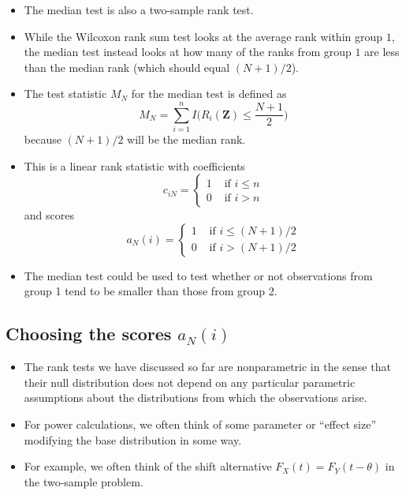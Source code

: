 \documentclass[]{book}
\begin{document}
\begin{itemize}
\item
  The median test is also a two-sample rank test.
\item
  While the Wilcoxon rank sum test looks at the average rank within group \(1\),
  the median test instead looks at how many of the ranks from group \(1\)
  are less than the median rank (which should equal \((N+1)/2\)).
\item
  The test statistic \(M_{N}\) for the median test is defined as
  \begin{equation}
  M_{N} = \sum_{i=1}^{n} I\Big( R_{i}(\mathbf{Z}) \leq \frac{N+1}{2} \Big)
  \end{equation}
  because \((N+1)/2\) will be the median rank.
\item
  This is a linear rank statistic with coefficients
  \begin{equation}
  c_{iN} = \begin{cases}
   1 & \textrm{ if } i \leq n \\
   0 & \textrm{ if } i > n 
   \end{cases}
  \end{equation}
  and scores
  \begin{equation}
  a_{N}(i) = 
  \begin{cases}
   1 & \textrm{ if } i \leq (N+1)/2 \\
   0 & \textrm{ if } i > (N+1)/2 
   \end{cases}
  \end{equation}
\item
  The median test could be used to test whether or not observations
  from group 1 tend to be smaller than those from group 2.
\end{itemize}

\hypertarget{choosing-the-scores-a_ni}{%
\subsection{\texorpdfstring{Choosing the scores \(a_{N}(i)\)}{Choosing the scores a\_\{N\}(i)}}\label{choosing-the-scores-a_ni}}

\begin{itemize}
\item
  The rank tests we have discussed so far are nonparametric in the sense
  that their null distribution does not depend on any particular parametric
  assumptions about the distributions from which the observations arise.
\item
  For power calculations, we often think of some parameter or ``effect size''
  modifying the base distribution in some way.
\item
  For example, we often think of the shift alternative \(F_{X}(t) = F_{Y}(t - \theta)\)
  in the two-sample problem.
\end{itemize}
\end{document}
